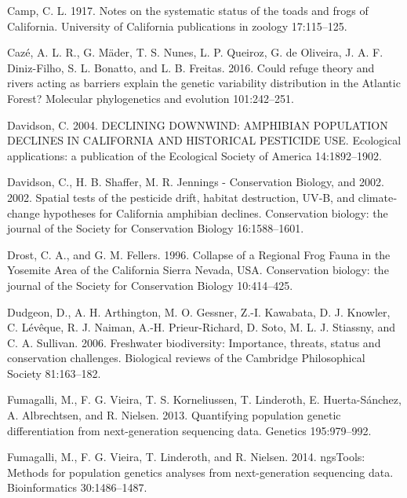 \documentclass[twoside,12pt,final]{ucthesis-CA2012} %
\begin{document}
\begin{ucmainmatter}
\leavevmode\hypertarget{ref-camp_notes_1917}{}%
Camp, C. L. 1917. Notes on the systematic status of the toads and frogs
of California. University of California publications in zoology
17:115--125.

\leavevmode\hypertarget{ref-caze_could_2016}{}%
Cazé, A. L. R., G. Mäder, T. S. Nunes, L. P. Queiroz, G. de Oliveira, J.
A. F. Diniz-Filho, S. L. Bonatto, and L. B. Freitas. 2016. Could refuge
theory and rivers acting as barriers explain the genetic variability
distribution in the Atlantic Forest? Molecular phylogenetics and
evolution 101:242--251.

\leavevmode\hypertarget{ref-davidson_declining_2004}{}%
Davidson, C. 2004. DECLINING DOWNWIND: AMPHIBIAN POPULATION DECLINES IN
CALIFORNIA AND HISTORICAL PESTICIDE USE. Ecological applications: a
publication of the Ecological Society of America 14:1892--1902.

\leavevmode\hypertarget{ref-davidson_spatial_2002}{}%
Davidson, C., H. B. Shaffer, M. R. Jennings - Conservation Biology, and
2002. 2002. Spatial tests of the pesticide drift, habitat destruction,
UV‐B, and climate‐change hypotheses for California amphibian declines.
Conservation biology: the journal of the Society for Conservation
Biology 16:1588--1601.

\leavevmode\hypertarget{ref-drost_collapse_1996}{}%
Drost, C. A., and G. M. Fellers. 1996. Collapse of a Regional Frog Fauna
in the Yosemite Area of the California Sierra Nevada, USA. Conservation
biology: the journal of the Society for Conservation Biology
10:414--425.

\leavevmode\hypertarget{ref-dudgeon_freshwater_2006}{}%
Dudgeon, D., A. H. Arthington, M. O. Gessner, Z.-I. Kawabata, D. J.
Knowler, C. Lévêque, R. J. Naiman, A.-H. Prieur-Richard, D. Soto, M. L.
J. Stiassny, and C. A. Sullivan. 2006. Freshwater biodiversity:
Importance, threats, status and conservation challenges. Biological
reviews of the Cambridge Philosophical Society 81:163--182.

\leavevmode\hypertarget{ref-fumagalli_quantifying_2013}{}%
Fumagalli, M., F. G. Vieira, T. S. Korneliussen, T. Linderoth, E.
Huerta-Sánchez, A. Albrechtsen, and R. Nielsen. 2013. Quantifying
population genetic differentiation from next-generation sequencing data.
Genetics 195:979--992.

\leavevmode\hypertarget{ref-fumagalli_ngstools:_2014}{}%
Fumagalli, M., F. G. Vieira, T. Linderoth, and R. Nielsen. 2014.
ngsTools: Methods for population genetics analyses from next-generation
sequencing data. Bioinformatics 30:1486--1487.


\end{ucmainmatter}
\end{document}
